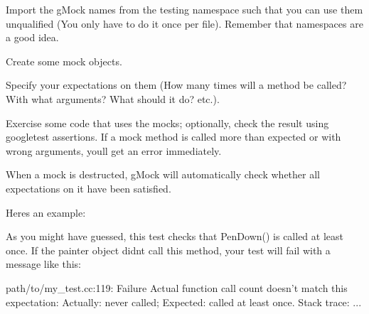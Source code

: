 \begin{DoxyEnumerate}
\item Import the g\+Mock names from the {\ttfamily testing} namespace such that you can use them unqualified (You only have to do it once per file). Remember that namespaces are a good idea.
\item Create some mock objects.
\item Specify your expectations on them (How many times will a method be called? With what arguments? What should it do? etc.).
\item Exercise some code that uses the mocks; optionally, check the result using googletest assertions. If a mock method is called more than expected or with wrong arguments, you\textquotesingle{}ll get an error immediately.
\item When a mock is destructed, g\+Mock will automatically check whether all expectations on it have been satisfied.
\end{DoxyEnumerate}

Here\textquotesingle{}s an example\+:




As you might have guessed, this test checks that {\ttfamily Pen\+Down()} is called at least once. If the {\ttfamily painter} object didn\textquotesingle{}t call this method, your test will fail with a message like this\+:


\begin{DoxyCode}
path/to/my\_test.cc:119: Failure
Actual function call count doesn't match this expectation:
Actually: never called;
Expected: called at least once.
Stack trace:
...
\end{DoxyCode}


